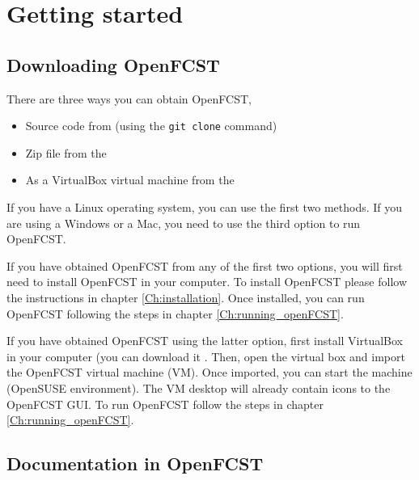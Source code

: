 \chapter{Getting started}
\section{Downloading OpenFCST}
There are three ways you can obtain OpenFCST,
\begin{itemize}
 \item Source code from  (using the \texttt{git clone} command)
 \item Zip file from the 
 \item As a VirtualBox virtual machine from the 
\end{itemize}

If you have a Linux operating system, you can use the first two methods. If you are using a Windows or a Mac, you need to use the third option to run OpenFCST. 

If you have obtained OpenFCST from any of the first two options,  you will first need to install OpenFCST in your computer. To install OpenFCST please follow the instructions in chapter \ref{Ch:installation}. Once installed, you can run OpenFCST following the steps in chapter \ref{Ch:running_openFCST}.

If you have obtained OpenFCST using the latter option, first install VirtualBox in your computer (you can download it . Then, open the virtual box and import the OpenFCST virtual machine (VM). Once imported, you can start the machine (OpenSUSE environment). The VM desktop will already contain icons to the OpenFCST GUI. To run OpenFCST follow the steps in chapter \ref{Ch:running_openFCST}.

\section{Documentation in OpenFCST}

